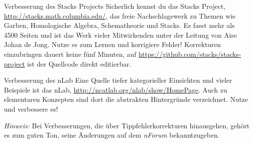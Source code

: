 \documentclass{uebblatt}
\begin{document}

\begin{aufgabe}{Verbesserung des Stacks Projects}
Sicherlich kennst du das Stacks Project,
\url{http://stacks.math.columbia.edu/}, das freie Nachschlagewerk zu Themen wie
Garben, Homologische Algebra, Schematheorie und Stacks. Es fasst mehr als 4500
Seiten und ist das Werk vieler Mitwirkenden unter der Leitung von Aise Johan de
Jong. Nutze es zum Lernen und korrigiere Fehler! Korrekturen einzubringen
dauert keine fünf Minuten, auf \url{https://github.com/stacks/stacks-project}
ist der Quellcode direkt editierbar.
\end{aufgabe}

\begin{aufgabe}{Verbesserung des nLab}
Eine Quelle tiefer kategorieller Einsichten und vieler Beispiele ist das nLab,
\url{http://ncatlab.org/nlab/show/HomePage}. Auch zu elementaren Konzepten sind
dort die abstrakten Hintergründe verzeichnet. Nutze und verbessere es!

{\tiny\emph{Hinweis:} Bei Verbesserungen, die über Tippfehlerkorrekturen
hinausgehen, gehört es zum guten Ton, seine Änderungen auf dem \emph{nForum}
bekanntzugeben.\par}
\end{aufgabe}
\end{document}
